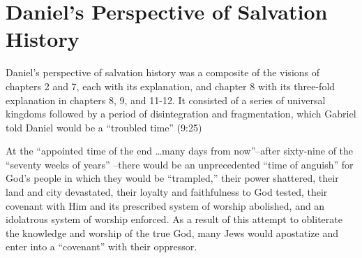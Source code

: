 \section{Daniel's Perspective of Salvation History}

Daniel's perspective of salvation history was a composite of the visions of
chapters 2 and 7, each with its explanation, and chapter 8 with
its three-fold explanation in chapters 8, 9, and 11-12. It consisted of a 
series of universal kingdoms followed by a period of disintegration and
fragmentation, which Gabriel told Daniel would be a ``troubled time''
(9:25)

At the ``appointed time of the end \ldots many days from now''--after sixty-nine
of the ``seventy weeks of years''
--there would be an unprecedented ``time of
anguish'' for God's people in which they would be ``trampled,'' their power
shattered, their land and city 
devastated, their loyalty and
faithfulness to God tested, 
their covenant with Him and its prescribed
system of worship abolished,
and an idolatrous system of worship
enforced. As a result of this attempt to obliterate the knowledge and
worship of the true God, many Jews would apostatize and enter into a
``covenant'' with their oppressor.

